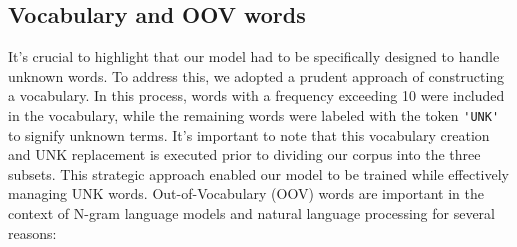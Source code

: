 \documentclass[11pt,onside]{article}
\begin{document}
\subsection*{Vocabulary and OOV words}
It's crucial to highlight that our model had to be specifically designed to handle unknown words. To address this, we adopted a prudent approach of constructing a vocabulary. In this process, words with a frequency exceeding 10 were included in the vocabulary, while the remaining words were labeled with the token \verb|'UNK'| to signify unknown terms. It's important to note that this vocabulary creation and UNK replacement is executed prior to dividing our corpus into the three subsets. This strategic approach enabled our model to be trained while effectively managing UNK words.
Out-of-Vocabulary (OOV) words are important in the context of N-gram language models and natural language processing for several reasons: 
\end{document}
